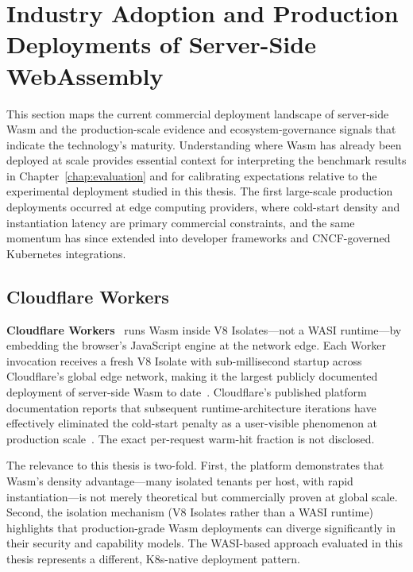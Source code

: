 \section{Industry Adoption and Production Deployments of Server-Side WebAssembly}
\label{sec:industry_landscape}

This section maps the current commercial deployment landscape of server-side \acs{Wasm} and the production-scale evidence and ecosystem-governance signals that indicate the technology's maturity. Understanding where \acs{Wasm} has already been deployed at scale provides essential context for interpreting the benchmark results in Chapter~\ref{chap:evaluation} and for calibrating expectations relative to the experimental deployment studied in this thesis. The first large-scale production deployments occurred at edge computing providers, where cold-start density and instantiation latency are primary commercial constraints, and the same momentum has since extended into developer frameworks and \acs{CNCF}-governed Kubernetes integrations.

\subsection{Cloudflare Workers}

\textbf{Cloudflare Workers}~\cite{cloudflare2024workers} runs \acs{Wasm} inside V8 Isolates---not a \acs{WASI} runtime---by embedding the browser's JavaScript engine at the network edge. Each Worker invocation receives a fresh V8 Isolate with sub-millisecond startup across Cloudflare's global edge network, making it the largest publicly documented deployment of server-side \acs{Wasm} to date~\cite{cloudflare2024workers}. Cloudflare's published platform documentation reports that subsequent runtime-architecture iterations have effectively eliminated the cold-start penalty as a user-visible phenomenon at production scale~\cite{cloudflare2024workers}. The exact per-request warm-hit fraction is not disclosed.

The relevance to this thesis is two-fold. First, the platform demonstrates that \acs{Wasm}'s density advantage---many isolated tenants per host, with rapid instantiation---is not merely theoretical but commercially proven at global scale. Second, the isolation mechanism (V8 Isolates rather than a \acs{WASI} runtime) highlights that production-grade \acs{Wasm} deployments can diverge significantly in their security and capability models. The \acs{WASI}-based approach evaluated in this thesis represents a different, \acs{K8s}-native deployment pattern.

